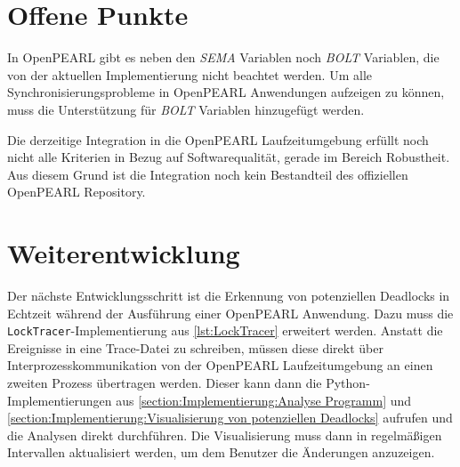 \section{Offene Punkte}
\label{section:OffenePunkte}
In OpenPEARL gibt es neben den \emph{SEMA} Variablen noch \emph{BOLT} Variablen,
die von der aktuellen Implementierung nicht beachtet werden. Um alle
Synchronisierungsprobleme in OpenPEARL Anwendungen aufzeigen zu können, muss die
Unterstützung für \emph{BOLT} Variablen hinzugefügt werden.

Die derzeitige Integration in die OpenPEARL Laufzeitumgebung erfüllt noch nicht
alle Kriterien in Bezug auf Softwarequalität, gerade im Bereich Robustheit. Aus
diesem Grund ist die Integration noch kein Bestandteil des offiziellen OpenPEARL
Repository.

\section{Weiterentwicklung}
\label{section:Weiterentwicklung}
Der nächste Entwicklungsschritt ist die Erkennung von potenziellen Deadlocks in
Echtzeit während der Ausführung einer OpenPEARL Anwendung. Dazu muss die
\texttt{LockTracer}-Implementierung aus \cref{lst:LockTracer} erweitert werden.
Anstatt die Ereignisse in eine Trace-Datei zu schreiben, müssen diese direkt
über Interprozesskommunikation von der OpenPEARL Laufzeitumgebung an einen
zweiten Prozess übertragen werden. Dieser kann dann die Python-Implementierungen
aus \cref{section:Implementierung:Analyse Programm} und
\cref{section:Implementierung:Visualisierung von potenziellen Deadlocks}
aufrufen und die Analysen direkt durchführen. Die Visualisierung muss dann in
regelmäßigen Intervallen aktualisiert werden, um dem Benutzer die Änderungen
anzuzeigen.